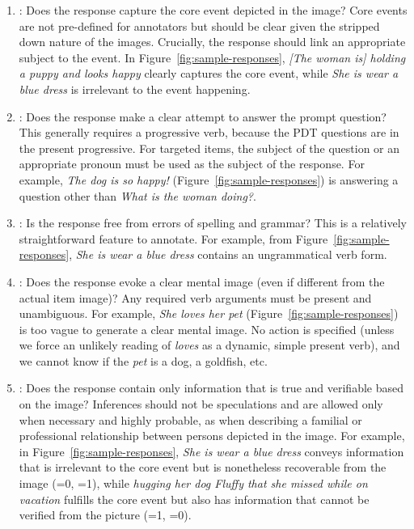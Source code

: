 \begin{enumerate}
\item \textbf{}: Does the response capture the core event depicted in the image? Core events are not pre-defined for annotators but should be clear given the stripped down nature of the images. Crucially, the response should link an appropriate subject to the event.  In Figure~\ref{fig:sample-responses}, \textit{[The woman is] holding a puppy and looks happy} clearly captures the core event, while \textit{She is wear a blue dress} is irrelevant to the event happening.
\item \textbf{}: Does the response make a clear attempt to answer the prompt question? This generally requires a progressive verb, because the PDT questions are in the present progressive. For targeted items, the subject of the question or an appropriate pronoun must be used as the subject of the response.  For example, \textit{The dog is so happy!} (Figure~\ref{fig:sample-responses}) is answering a question other than \textit{What is the woman doing?}. 
\item \textbf{}: Is the response free from errors of spelling and grammar?  
This is a relatively straightforward feature to annotate. For example, from Figure~\ref{fig:sample-responses}, \textit{She is wear a blue dress} contains an ungrammatical verb form.
\item \textbf{}: Does the response evoke a clear mental image (even if different from the actual item image)? Any required verb arguments must be present and unambiguous.  For example, \textit{She loves her pet} (Figure~\ref{fig:sample-responses}) is too vague to generate a clear mental image. No action is specified (unless we force an unlikely reading of \textit{loves} as a dynamic, simple present verb), and we cannot know if the \textit{pet} is a dog, a goldfish, etc.
\item \textbf{}: Does the response contain only information that is true and verifiable based on the image? Inferences should not be speculations and are allowed only when necessary and highly probable, as when describing a familial or professional relationship between persons depicted in the image.  For example, in Figure~\ref{fig:sample-responses}, \textit{She is wear a blue dress} conveys information that is irrelevant to the core event but is nonetheless recoverable from the image (=0, =1), while \textit{hugging her dog Fluffy that she missed while on vacation} fulfills the core event but also has information that cannot be verified from the picture (=1, =0).
\end{enumerate}












